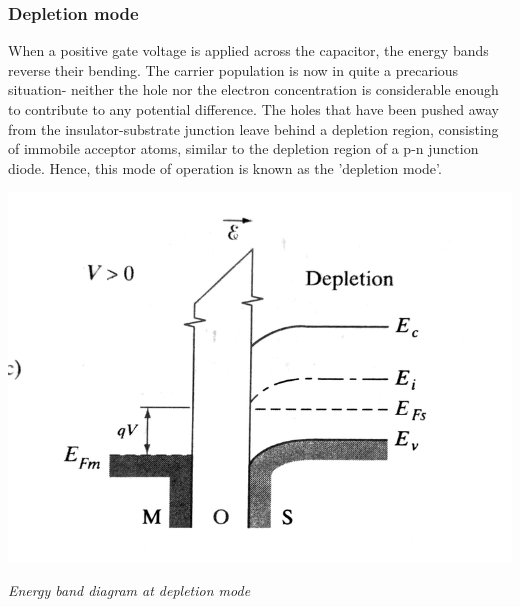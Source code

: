 \documentclass[12 pt]{article}
\begin{document}
\subsubsection{Depletion mode}

When a positive gate voltage is applied across the capacitor, the energy bands reverse their bending. The carrier population is now in quite a precarious situation- neither the hole nor the electron concentration is considerable enough to contribute to any potential difference. The holes that have been pushed away from the insulator-substrate junction leave behind a depletion region, consisting of immobile acceptor atoms, similar to the depletion region of a p-n junction diode. Hence, this mode of operation is known as the 'depletion mode'. \newline 

\par
\begin{center}
    \includegraphics{Depletion _mode.png}
\end{center}
\begin{center}
    \emph{\hspace{2 cm}Energy band diagram at depletion mode\newline}
\end{center}
\par
\end{document}
